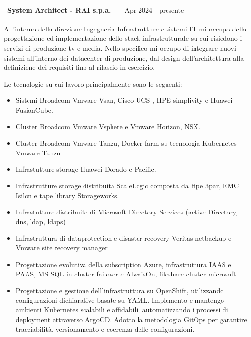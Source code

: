 \documentclass[a4paper,12pt]{article}
\makeatletter
\newenvironment{jobshort}[2]
    {
    \begin{tabularx}{\linewidth}{@{}l X r@{}}
    \textbf{#1} & \hfill &  #2 \\[3.75pt]
    \end{tabularx}
    }
    {
    }
\makeatother
\begin{document}
\begin{jobshort}{System Architect - RAI s.p.a.}{Apr 2024 - presente}
All’interno della direzione Ingegneria Infrastrutture e sistemi IT mi occupo della progettazione ed implementazione dello stack infrastrutturale su cui risiedono i servizi di produzione tv e media.
Nello specifico mi occupo di integrare nuovi sistemi all’interno dei datacenter di produzione, dal design dell’architettura alla definizione dei requisiti fino al rilascio in esercizio.

Le tecnologie su cui lavoro principalmente sono le seguenti:

\begin{itemize}
\item Sistemi Broadcom Vmware Vsan, Cisco UCS , HPE simplivity e Huawei FusionCube.
\item Cluster Broadcom Vmware Vsphere e Vmware Horizon, NSX.
\item Cluster Broadcom Vmware Tanzu, Docker farm su tecnologia Kubernetes Vmware Tanzu
\item Infrastutture storage Huawei Dorado e Pacific.
\item Infrastrutture storage distribuita ScaleLogic composta da Hpe 3par, EMC Isilon e tape library Storageworks.
\item Infrastutture distribuite di Microsoft Directory Services (active Directory, dns, ldap, ldaps)
\item Infrastruttura di dataprotection e disaster recovery Veritas netbackup e Vmware site recovery manager
\item Progettazione evolutiva della subscription Azure, infrastruttura IAAS e PAAS, MS SQL in cluster failover e AlwaisOn, fileshare cluster microsoft.
\item Progettazione e gestione dell’infrastruttura su OpenShift, utilizzando configurazioni dichiarative basate su YAML. Implemento e mantengo ambienti Kubernetes scalabili e affidabili, automatizzando i processi di deployment attraverso ArgoCD. Adotto la metodologia GitOps per garantire tracciabilità, versionamento e coerenza delle configurazioni.
\end{itemize}

\end{jobshort}

\vspace{6pt}
\end{document}
